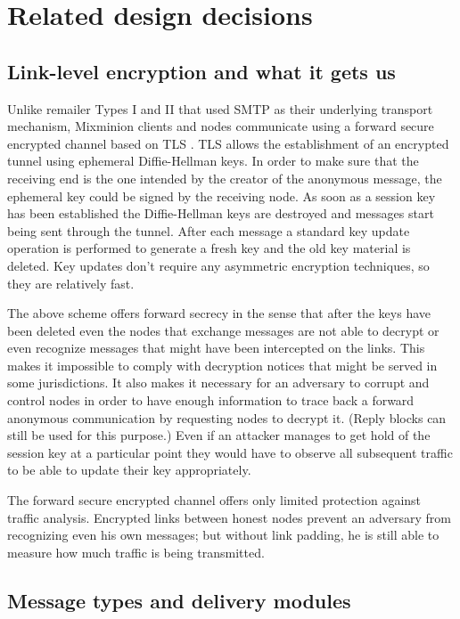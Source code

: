 \documentclass{llncs}
\begin{document}
\section{Related design decisions}

\subsection{Link-level encryption and what it gets us}
\label{subsec:link-encrypt}

Unlike remailer Types I and II that used SMTP as their underlying
transport mechanism, Mixminion clients and nodes communicate using a
forward secure encrypted channel based on TLS \cite{TLS}.  TLS allows
the establishment of an encrypted tunnel using ephemeral
Diffie-Hellman keys. In order to make sure that the receiving end is
the one intended by the creator of the anonymous message, the
ephemeral key could be signed by the receiving node. As soon as a
session key has been established the Diffie-Hellman keys are destroyed
and messages start being sent through the tunnel. After each message a
standard key update operation is performed to generate a fresh key and
the old key material is deleted. Key updates don't require any
asymmetric encryption techniques, so they are relatively fast.

The above scheme offers forward secrecy in the sense that after the keys
have been deleted even the
nodes that exchange messages are not able to decrypt or even recognize
messages that might have been intercepted on the links. This makes it
impossible to comply with decryption notices that might be served in
some jurisdictions.  It also makes it necessary for an adversary to
corrupt and control nodes in order to have enough information to trace
back a forward anonymous communication by requesting nodes to decrypt
it. (Reply blocks can still be used for this purpose.)  Even if an
attacker manages to get hold of the session key at a particular point
they would have to observe all subsequent traffic to be able to update
their key appropriately.

The forward secure encrypted channel offers only limited protection
against traffic analysis. Encrypted links between honest nodes prevent
an adversary from recognizing even his own messages; but without
link padding, he is still able to measure how much traffic is being
transmitted.

\subsection{Message types and delivery modules}
\label{subsec:delivery-modules}
\end{document}
